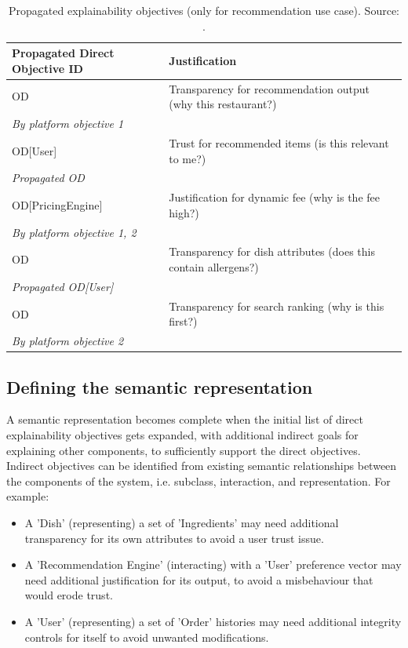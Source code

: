 \documentclass[preprint,10pt]{elsarticle}
\begin{document}
\begin{table}[h!]
    \caption{Propagated explainability objectives (only for recommendation use case). Source: .}
    \label{tab:2}
    \centering
    \begin{tabularx}{\textwidth}{lX}
        \toprule
        \textbf{Propagated Direct Objective ID} & \textbf{Justification} \\
        \midrule
        OD & Transparency for recommendation output (why this restaurant?) \\
        \textit{By platform objective 1} \\
        OD[User] & Trust for recommended items (is this relevant to me?) \\
        \textit{Propagated OD} \\
        OD[PricingEngine] & Justification for dynamic fee (why is the fee high?) \\
        \textit{By platform objective 1, 2} \\
        OD & Transparency for dish attributes (does this contain allergens?) \\
        \textit{Propagated OD[User]} \\
        OD & Transparency for search ranking (why is this first?) \\
        \textit{By platform objective 2} \\
        \bottomrule
    \end{tabularx}
\end{table}

\subsection{Defining the semantic representation}

A semantic representation becomes complete when the initial list of direct explainability objectives gets expanded, with additional indirect goals for explaining other components, to sufficiently support the direct objectives. Indirect objectives can be identified from existing semantic relationships between the components of the system, i.e. subclass, interaction, and representation. For example:

\begin{itemize}
    \item A 'Dish' (representing) a set of 'Ingredients' may need additional transparency for its own attributes to avoid a user trust issue.
    \item A 'Recommendation Engine' (interacting) with a 'User' preference vector may need additional justification for its output, to avoid a misbehaviour that would erode trust.
    \item A 'User' (representing) a set of 'Order' histories may need additional integrity controls for itself to avoid unwanted modifications.
\end{itemize}
\end{document}
